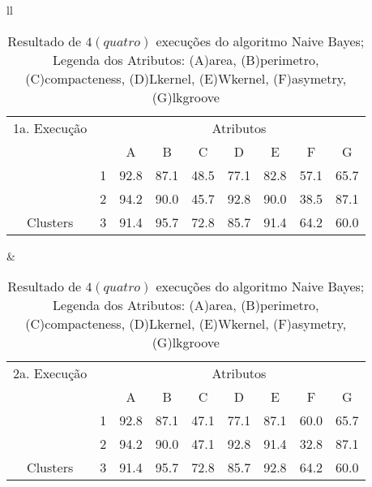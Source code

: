 \begin{table}[!h]
\caption{Resultado de ${4(quatro)}$ execuções do algoritmo Naive Bayes; Legenda dos Atributos: (A)area, (B)perimetro, (C)compacteness, (D)Lkernel, (E)Wkernel, (F)asymetry, (G)lkgroove}
 \begin{tabular}{ll}

  
   \small\addtolength{\tabcolsep}{-5pt}
     \begin{tabular}{|cl|c|c|c|c|c|c|c|}
        \hline \hline
            {\tiny 1a. Execução}     &   & \multicolumn{7}{c|}{Atributos}                                               \\ \cline{3-9} 
       \multicolumn{1}{|l}{}                            &   & A    & B & C & D & E & F & G \\ \hline
        \multicolumn{1}{|c|}{}                           & 1 & 92.8 & 87.1   & 48.5      & 77.1 & 82.8 & 57.1   & 65.7   \\ \cline{2-9} 
        \multicolumn{1}{|c|}{}                           & 2 & 94.2 & 90.0   & 45.7      & 92.8 & 90.0 & 38.5  & 87.1  \\ \cline{2-9} 
        \multicolumn{1}{|c|}{\multirow{-3}{*}{Clusters}} & 3 & 91.4 & 95.7   & 72.8      & 85.7 & 91.4 & 64.2  & 60.0  \\ \hline
      \end{tabular}
 &
 
   
   \small\addtolength{\tabcolsep}{-5pt}
   \begin{tabular}{|cl|c|c|c|c|c|c|c|}
        \hline \hline
             {\tiny 2a. Execução }       &   & \multicolumn{7}{c|}{Atributos}                                               \\ \cline{3-9} 
       \multicolumn{1}{|l}{}                            &   & A    & B & C & D & E & F & G \\ \hline
        \multicolumn{1}{|c|}{}                           & 1 & 92.8 & 87.1   & 47.1      & 77.1 & 87.1 & 60.0   & 65.7   \\ \cline{2-9} 
        \multicolumn{1}{|c|}{}                           & 2 & 94.2 & 90.0   & 47.1      & 92.8 & 91.4 & 32.8  & 87.1  \\ \cline{2-9} 
        \multicolumn{1}{|c|}{\multirow{-3}{*}{Clusters}} & 3 & 91.4 & 95.7   & 72.8      & 85.7 & 92.8 & 64.2  & 60.0  \\ \hline
      \end{tabular}
  \\  [8ex]
 

\end{tabular}
\end{table}
